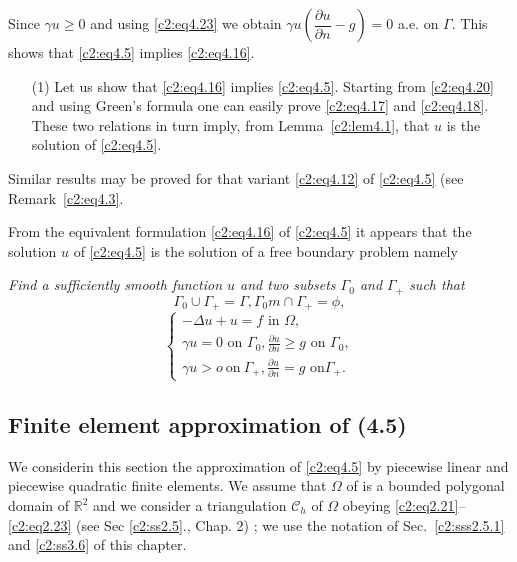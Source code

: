 Since  $\gamma u \geq 0$ and using \eqref{c2:eq4.23} we obtain $\gamma u
\left(\dfrac{\partial u}{\partial  n}- g\right) =0 $ a.e. on
$\Gamma$. This shows that \eqref{c2:eq4.5} implies \eqref{c2:eq4.16}. 
\begin{enumerate}
\item[(1)] Let us show that \eqref{c2:eq4.16} implies
  \eqref{c2:eq4.5}. Starting from \eqref{c2:eq4.20} 
  and using Green's formula one can easily  prove \eqref{c2:eq4.17} and
  \eqref{c2:eq4.18}. These two relations in turn imply, from
  Lemma~\ref{c2:lem4.1}, that $u$ is the solution of \eqref{c2:eq4.5}.  
\end{enumerate}

\begin{remark}\label{c2:rem4.4}%
Similar results may be  proved for that variant \eqref{c2:eq4.12} of
\eqref{c2:eq4.5} 
(see Remark~\eqref{c2:eq4.3}.  
\end{remark}

\begin{remark}\label{c2:rem4.5}%
From the equivalent formulation \eqref{c2:eq4.16} of \eqref{c2:eq4.5}
it appears that the solution $u$ of \eqref{c2:eq4.5} is the solution
of a free boundary problem namely  
 
{\em Find a sufficiently smooth function $u$ and two subsets
  $\Gamma_0$ and $\Gamma_+$ such that} 
\begin{equation}
\Gamma_0  \cup \Gamma_+ = \Gamma, \Gamma_0 m \cap \Gamma_+ = \phi,
\tag{4.25}\label{c2:eq4.25} 
\end{equation}
\begin{equation}
\begin{cases}
-\Delta u+u = f \text{ in }\Omega,\\
\gamma u = 0 \text{ on }\Gamma_0, \frac{\partial u}{\partial n}\geq g \text{ on } \Gamma_0,\\
\gamma u > o ~\text{on}~ \Gamma_+, \frac{\partial u}{\partial n} = g \text{ on
} \Gamma_+.\tag{4.26}\label{c2:eq4.26} 
\end{cases}
\end{equation}
\end{remark}

\subsection{Finite element approximation of (4.5)}\label{c2:ss4.4} 

We consider\pageoriginale  in this section  the approximation of \eqref{c2:eq4.5} by
piecewise linear and piecewise quadratic finite elements. We assume
that $\Omega$ of is a bounded polygonal domain of $\mathbb{R}^2$ and
we consider a triangulation $\mathscr{C}_h$ of $\Omega$ obeying 
\eqref{c2:eq2.21}--\eqref{c2:eq2.23} (see Sec \ref{c2:ss2.5}., Chap. 2) ; we use
the notation of Sec.~\ref{c2:sss2.5.1} and \ref{c2:ss3.6} of this
chapter.  

